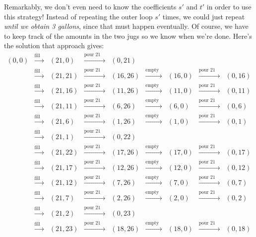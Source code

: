 Remarkably, we don't even need to know the coefficients $s'$ and $t'$
in order to use this strategy!  Instead of repeating the outer loop
$s'$ times, we could just repeat \textit{until we obtain 3 gallons},  
since that must happen eventually.  Of course, we have to keep track
of the amounts in the two jugs so we know when we're done.  Here's the
solution that approach gives:
%
\[
\begin{array}{ccccccccc}
(0,0) & \xrightarrow{\text{fill 21}} & (21,0)& \xrightarrow{\text{pour 21 into 26}} & (0,21)\\
& \xrightarrow{\text{fill 21}} & (21,21)& \xrightarrow{\text{pour 21 into 26}} & (16,26)& \xrightarrow{\text{empty 26}} & (16,0)& \xrightarrow{\text{pour 21 into 26}} & (0,16)\\
& \xrightarrow{\text{fill 21}} & (21,16)& \xrightarrow{\text{pour 21 into 26}} & (11,26)& \xrightarrow{\text{empty 26}} & (11,0)& \xrightarrow{\text{pour 21 into 26}} & (0,11)\\
& \xrightarrow{\text{fill 21}} & (21,11)& \xrightarrow{\text{pour 21 into 26}} & (6,26)& \xrightarrow{\text{empty 26}} & (6,0)& \xrightarrow{\text{pour 21 into 26}} & (0,6)\\
& \xrightarrow{\text{fill 21}} & (21,6)& \xrightarrow{\text{pour 21 into 26}} & (1,26)& \xrightarrow{\text{empty 26}} & (1,0)& \xrightarrow{\text{pour 21 into 26}} & (0,1)\\
& \xrightarrow{\text{fill 21}} & (21,1)& \xrightarrow{\text{pour 21 into 26}} & (0,22)\\
& \xrightarrow{\text{fill 21}} & (21,22)& \xrightarrow{\text{pour 21 into 26}} & (17,26)& \xrightarrow{\text{empty 26}} & (17,0)& \xrightarrow{\text{pour 21 into 26}} & (0,17)\\
& \xrightarrow{\text{fill 21}} & (21,17)& \xrightarrow{\text{pour 21 into 26}} & (12,26)& \xrightarrow{\text{empty 26}} & (12,0)& \xrightarrow{\text{pour 21 into 26}} & (0,12)\\
& \xrightarrow{\text{fill 21}} & (21,12)& \xrightarrow{\text{pour 21 into 26}} & (7,26)& \xrightarrow{\text{empty 26}} & (7,0)& \xrightarrow{\text{pour 21 into 26}} & (0,7)\\
& \xrightarrow{\text{fill 21}} & (21,7)& \xrightarrow{\text{pour 21 into 26}} & (2,26)& \xrightarrow{\text{empty 26}} & (2,0)& \xrightarrow{\text{pour 21 into 26}} & (0,2)\\
& \xrightarrow{\text{fill 21}} & (21,2)& \xrightarrow{\text{pour 21 into 26}} & (0,23)\\
& \xrightarrow{\text{fill 21}} & (21,23)& \xrightarrow{\text{pour 21 into 26}} & (18,26)& \xrightarrow{\text{empty 26}} & (18,0)& \xrightarrow{\text{pour 21 into 26}} & (0,18)\\

\end{array}\]
